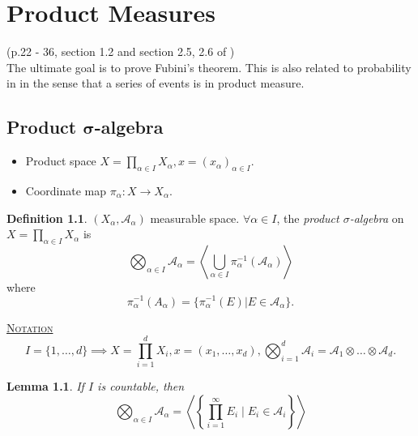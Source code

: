 \documentclass{report}
\newcommand{\cA}{\mathcal{A}}
\newcommand{\gen}[1]{\left\langle #1 \right\rangle}
\newcommand{\fancyem}[1]{\underline{\textsc{#1}}}
\newtheorem{lemma}[theorem]{Lemma}
\theoremstyle{definition}
\newtheorem{definition}[theorem]{Definition}
\theoremstyle{remark}
\newcommand*\ttlmath[2]{\texorpdfstring{$\boldsymbol{#1}$}{#2}}
\begin{document}
\chapter{Product Measures}
(p.22 - 36, section 1.2 and section 2.5, 2.6 of \cite{follandRealAnalysisModern1999}) \\ 
The ultimate goal is to prove Fubini's theorem. This is also related to probability in in the sense that a series of events is in product measure.
\section{Product \ttlmath{\sigma}{sigma}-algebra}
\begin{itemize}
	\item Product space $X = \prod_{\alpha \in I}X_\alpha, x = (x_\alpha)_{\alpha \in I}$.
	\item Coordinate map $\pi_\alpha: X \to X_\alpha$.
\end{itemize}
\begin{definition}
	$(X_\alpha, \cA_\alpha)$ measurable space. $\forall \alpha \in I$, the \emph{product $\sigma$-algebra} on $\displaystyle X = \prod_{\alpha \in I}X_\alpha$ is \[\bigotimes_{\alpha \in I} \cA_\alpha  = \gen{\bigcup_{\alpha \in I}\pi_\alpha^{-1}\left(\cA_\alpha\right)}\]
	where \[
		\pi^{-1}_\alpha\left(A_\alpha\right) = \{\pi^{-1}_\alpha(E) | E \in \cA_\alpha\}.
	\]
\end{definition}
\fancyem{Notation} \[I = \{1, \ldots, d\} \implies X = \prod_{i=1}^d X_i, x = (x_1, \ldots, x_d), \bigotimes_{i=1}^d \cA_i = \cA_1 \otimes \ldots \otimes \cA_d.\]

\begin{lemma}
	If $I$ is countable, then 
	\[
		\bigotimes_{\alpha \in I} \cA_\alpha = \gen{\left\lbrace \prod_{i=1}^\infty E_i \mid E_i \in \cA_i \right\rbrace}
	\]
\end{lemma}




{}

\end{document}
